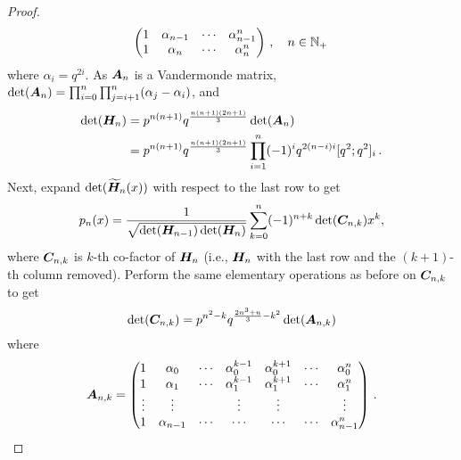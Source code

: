 \begin{subappendices}
\begin{proof}
\begin{equation}
\begin{pmatrix}
1 & \alpha_{n-1} & \cdots & \alpha_{n-1}^n\\
1 & \alpha_n     & \cdots & \alpha_n^n
\end{pmatrix}
\,, \quad n \in \mathbb{N}_+\,
\end{equation}
where $\alpha_i=q^{2i}$. As $\bm{A}_n$ is a Vandermonde matrix, $\det(\bm{A}_n) = \prod_{i=0}^{n} \prod_{j=i+1}^{n} (\alpha_j - \alpha_i)$, and
\begin{align}
\det(\bm{H}_n)
&= p^{n(n+1)} q^{\frac{n(n+1)(2n+1)}{3}} \det(\bm{A}_n) \label{detA_detH} \\
&= p^{n(n+1)} q^{\frac{n(n+1)(2n+1)}{3}}
\prod_{i=1}^{n} (-1)^i q^{2(n-i)i} [q^2; q^2]_i \,. \label{det_H}
\end{align}
Next, expand $\det(\widetilde{\bm{H}}_n(x))$ with respect to the last row to get
\begin{equation}\label{eq:PolynomialExpression1}
p_{n}(x)=\frac{1}{\sqrt{\det(\bm{H}_{n-1})\det(\bm{H}_n)}}\sum_{k=0}^{n}(-1)^{n+k} \det(\bm{C}_{n,k}) x^{k},
\end{equation}
where $\bm{C}_{n,k}$ is $k$-th co-factor of $\bm{H}_n$ (i.e., $\bm{H}_n$ with the last row and the $(k+1)$-th column removed). Perform the same elementary operations as before on $\bm{C}_{n,k}$ to get
\begin{equation} \label{cofactor_det}
\det(\bm{C}_{n,k})=p^{n^{2}-k}q^{\frac{2n^{3}+n}{3}-k^{2}} \det( \bm{A}_{n,k} )
\end{equation}
where
\[ \bm{A}_{n,k} = \begin{pmatrix}
1&\alpha_{0}&\cdots&\alpha_{0}^{k-1}&\alpha_{0}^{k+1}&\cdots&\alpha_{0}^{n} \\
1&\alpha_{1}&\cdots&\alpha_{1}^{k-1}&\alpha_{1}^{k+1}&\cdots&\alpha_{1}^{n}  \\
\vdots&\vdots& &\vdots&\vdots&&\vdots\\
1&\alpha_{n-1}&\cdots&\cdots&\cdots&\cdots&\alpha_{n-1}^{n}
\end{pmatrix}  \,. \]


\end{proof}
\end{subappendices}
